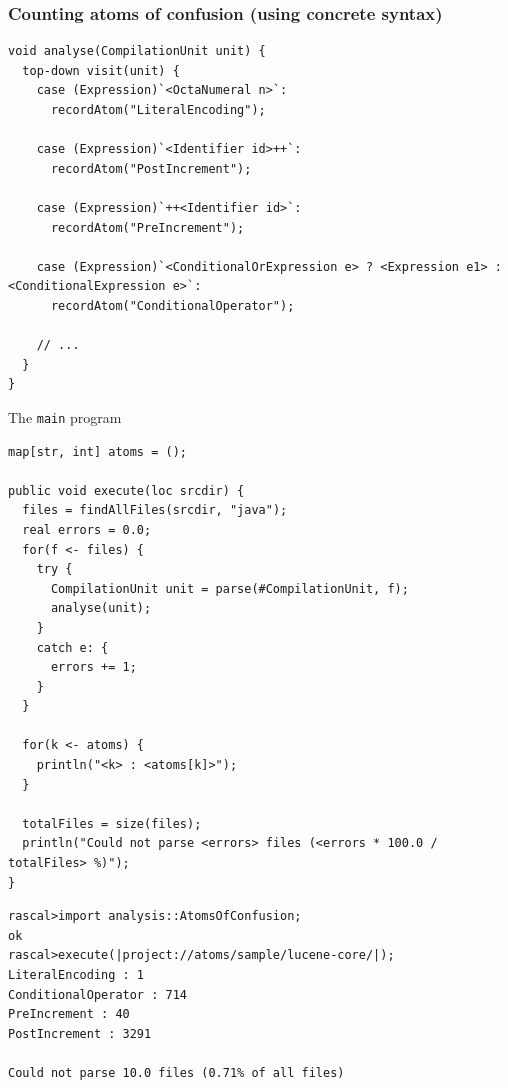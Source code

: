 \documentclass{beamer}
\begin{document}
\begin{frame}[fragile]
  \frametitle{Counting atoms of confusion (using concrete syntax)}

  \begin{lstlisting}[language=Rascal]
void analyse(CompilationUnit unit) {
  top-down visit(unit) {
    case (Expression)`<OctaNumeral n>`:
      recordAtom("LiteralEncoding"); 

    case (Expression)`<Identifier id>++`:
      recordAtom("PostIncrement");

    case (Expression)`++<Identifier id>`:
      recordAtom("PreIncrement"); 

    case (Expression)`<ConditionalOrExpression e> ? <Expression e1> : <ConditionalExpression e>`:
      recordAtom("ConditionalOperator");

    // ... 
  }
}
  \end{lstlisting}  
\end{frame}

\begin{frame}[fragile]
  \begin{block}{The \texttt{main} program}

    \begin{lstlisting}[language=Rascal]
map[str, int] atoms = ();

public void execute(loc srcdir) {
  files = findAllFiles(srcdir, "java");
  real errors = 0.0; 
  for(f <- files) {
    try { 
      CompilationUnit unit = parse(#CompilationUnit, f); 
      analyse(unit);
    }
    catch e: {
      errors += 1;
    }
  }
	
  for(k <- atoms) {
    println("<k> : <atoms[k]>"); 
  }
	
  totalFiles = size(files);
  println("Could not parse <errors> files (<errors * 100.0 / totalFiles> %)"); 
}
    \end{lstlisting}
    \end{block}
\end{frame}

\begin{frame}[fragile]
\begin{small}
\begin{verbatim}
rascal>import analysis::AtomsOfConfusion;
ok
rascal>execute(|project://atoms/sample/lucene-core/|);
LiteralEncoding : 1
ConditionalOperator : 714
PreIncrement : 40
PostIncrement : 3291

Could not parse 10.0 files (0.71% of all files)  
\end{verbatim}
\end{small}
\end{frame}
\end{document}
